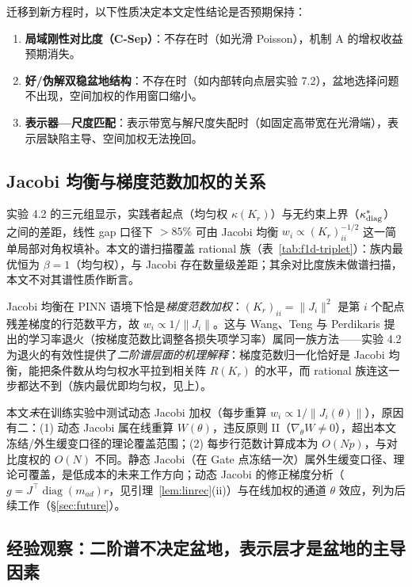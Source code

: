 \documentclass[fontset=windows,11pt]{ctexart}
\newcommand{\W}{W}
\DeclareMathOperator{\diag}{diag}
\numberwithin{equation}{section}
\begin{document}
迁移到新方程时，以下性质决定本文定性结论是否预期保持：
\begin{enumerate}[label=(\arabic*),leftmargin=2em,itemsep=1pt]
\item \textbf{局域刚性对比度（C-Sep）}：不存在时（如光滑 Poisson），机制 A 的增权收益预期消失。
\item \textbf{好/伪解双稳盆地结构}：不存在时（如内部转向点层实验 7.2），盆地选择问题不出现，空间加权的作用窗口缩小。
\item \textbf{表示器—尺度匹配}：表示带宽与解尺度失配时（如固定高带宽在光滑端），表示层缺陷主导、空间加权无法挽回。
\end{enumerate}

\subsection{Jacobi 均衡与梯度范数加权的关系}\label{sec:jacobi-gap}

实验 4.2 的三元组显示，实践者起点（均匀权 $\kappa(K_r)$）与无约束上界（$\kappa^*_{\rm diag}$）之间的差距，线性 gap 口径下 $>85\%$ 可由 Jacobi 均衡 $w_i\propto(K_r)_{ii}^{-1/2}$ 这一简单局部对角权填补。本文的谱扫描覆盖 rational 族（表~\ref{tab:f1d-triplet}）：族内最优恒为 $\beta=1$（均匀权），与 Jacobi 存在数量级差距；其余对比度族未做谱扫描，本文不对其谱性质作断言。

Jacobi 均衡在 PINN 语境下恰是\emph{梯度范数加权}：$(K_r)_{ii}=\|J_i\|^2$ 是第 $i$ 个配点残差梯度的行范数平方，故 $w_i\propto 1/\|J_i\|$。这与 Wang、Teng 与 Perdikaris\cite{WangTeng2020} 提出的学习率退火（按梯度范数比调整各损失项学习率）属同一族方法——实验 4.2 为退火的有效性提供了\emph{二阶谱层面的机理解释}：梯度范数归一化恰好是 Jacobi 均衡，能把条件数从均匀权水平拉到相关阵 $R(K_r)$ 的水平，而 rational 族连这一步都达不到（族内最优即均匀权，见上）。

本文\emph{未}在训练实验中测试动态 Jacobi 加权（每步重算 $w_i\propto 1/\|J_i(\theta)\|$），原因有二：(1) 动态 Jacobi 属在线重算 $\W(\theta)$，违反原则 II（$\nabla_\theta\W\ne0$），超出本文冻结/外生缓变口径的理论覆盖范围；(2) 每步行范数计算成本为 $O(Np)$，与对比度权的 $O(N)$ 不同。静态 Jacobi（在 Gate 点冻结一次）属外生缓变口径、理论可覆盖，是低成本的未来工作方向；动态 Jacobi 的修正梯度分析（$g=J^\top\diag(m_{ad})r$，见引理~\ref{lem:linrec}(ii)）与在线加权的通道 $\theta$ 效应，列为后续工作（\S\ref{sec:future}）。

\subsection{经验观察：二阶谱不决定盆地，表示层才是盆地的主导因素}\label{sec:S-observation}
\end{document}
